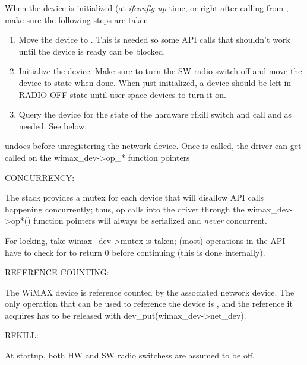 \documentclass[a4paper,8pt,english]{sphinxmanual}
\begin{document}
When the device is initialized (at \emph{ifconfig up} time, or right
after calling {\hyperref[networking/kapi:c.wimax_dev_add]{\emph{}}} from , make sure the
following steps are taken
\begin{enumerate}
\item {} 
Move the device to . This is needed so
some API calls that shouldn't work until the device is ready
can be blocked.

\item {} 
Initialize the device. Make sure to turn the SW radio switch
off and move the device to state  when
done. When just initialized, a device should be left in RADIO
OFF state until user space devices to turn it on.

\item {} 
Query the device for the state of the hardware rfkill switch
and call  and 
as needed. See below.

\end{enumerate}

{\hyperref[networking/kapi:c.wimax_dev_rm]{\emph{}}} undoes before unregistering the network device. Once
{\hyperref[networking/kapi:c.wimax_dev_add]{\emph{}}} is called, the driver can get called on the
wimax\_dev-\textgreater{}op\_* function pointers

CONCURRENCY:

The stack provides a mutex for each device that will disallow API
calls happening concurrently; thus, op calls into the driver
through the wimax\_dev-\textgreater{}op*() function pointers will always be
serialized and \emph{never} concurrent.

For locking, take wimax\_dev-\textgreater{}mutex is taken; (most) operations in
the API have to check for  to return 0 before
continuing (this is done internally).

REFERENCE COUNTING:

The WiMAX device is reference counted by the associated network
device. The only operation that can be used to reference the device
is , and the reference it acquires has
to be released with dev\_put(wimax\_dev-\textgreater{}net\_dev).

RFKILL:

At startup, both HW and SW radio switchess are assumed to be off.
\end{document}
